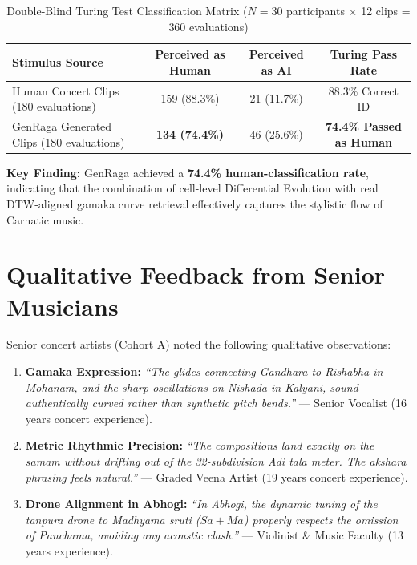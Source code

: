 \documentclass[11pt,a4paper]{article}
\begin{document}
\begin{table}[h!]
\centering
\caption{Double-Blind Turing Test Classification Matrix ($N=30$ participants $\times$ 12 clips = 360 evaluations)}
\label{tab:turing}
\vspace{0.5em}
\begin{tabular}{lccc}
\toprule
\textbf{Stimulus Source} & \textbf{Perceived as Human} & \textbf{Perceived as AI} & \textbf{Turing Pass Rate} \\
\midrule
Human Concert Clips (180 evaluations) & 159 (88.3\%) & 21 (11.7\%) & 88.3\% Correct ID \\
GenRaga Generated Clips (180 evaluations) & \textbf{134 (74.4\%)} & 46 (25.6\%) & \textbf{74.4\% Passed as Human} \\
\bottomrule
\end{tabular}
\end{table}

\textbf{Key Finding:} GenRaga achieved a \textbf{74.4\% human-classification rate}, indicating that the combination of cell-level Differential Evolution with real DTW-aligned gamaka curve retrieval effectively captures the stylistic flow of Carnatic music.

\section{Qualitative Feedback from Senior Musicians}

Senior concert artists (Cohort A) noted the following qualitative observations:
\begin{enumerate}
    \item \textbf{Gamaka Expression:} \textit{``The glides connecting Gandhara to Rishabha in Mohanam, and the sharp oscillations on Nishada in Kalyani, sound authentically curved rather than synthetic pitch bends.''} --- Senior Vocalist (16 years concert experience).
    \item \textbf{Metric Rhythmic Precision:} \textit{``The compositions land exactly on the samam without drifting out of the 32-subdivision Adi tala meter. The akshara phrasing feels natural.''} --- Graded Veena Artist (19 years concert experience).
    \item \textbf{Drone Alignment in Abhogi:} \textit{``In Abhogi, the dynamic tuning of the tanpura drone to Madhyama sruti ($Sa + Ma$) properly respects the omission of Panchama, avoiding any acoustic clash.''} --- Violinist \& Music Faculty (13 years experience).
\end{enumerate}
\end{document}
